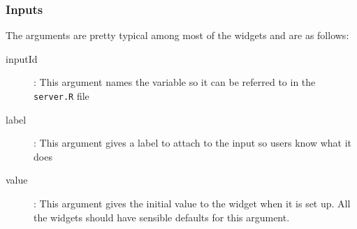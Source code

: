 \documentclass{beamer}
\begin{document}
\begin{frame}
\Large
\frametitle{Inputs}
The arguments are pretty typical among most of the widgets and are
as follows:
\begin{description}
\item[ inputId]: This argument names the variable so it can be referred to in the
\texttt{server.R} file
\item[ label]: This argument gives a label to attach to the input so users know
what it does
\item[value]: This argument gives the initial value to the widget when it is
set up. All the widgets should have sensible defaults for this argument.
\end{description}
\end{frame}
\end{document}
